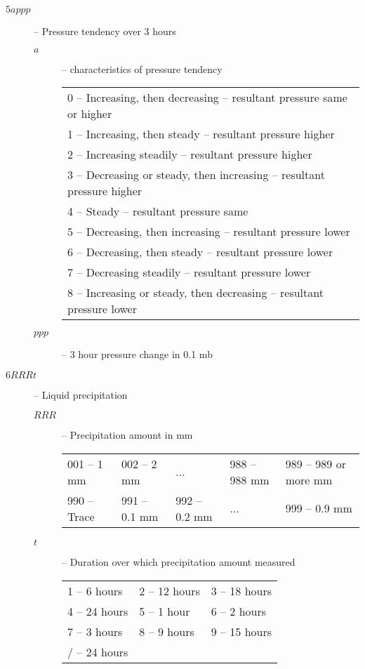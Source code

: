 \documentclass{article}
\begin{document}
\begin{description}
\item[$5appp$] -- Pressure tendency over 3 hours
  \begin{description}
  \item[$a$] -- characteristics of pressure tendency
    \begin{tabular}{l}
      0 -- Increasing, then decreasing -- resultant pressure same or higher\\
      1 -- Increasing, then steady -- resultant pressure higher\\
      2 -- Increasing steadily -- resultant pressure higher\\
      3 -- Decreasing or steady, then increasing -- resultant pressure higher\\
      4 -- Steady -- resultant pressure same\\
      5 -- Decreasing, then increasing -- resultant pressure lower\\
      6 -- Decreasing, then steady -- resultant pressure lower\\
      7 -- Decreasing steadily -- resultant pressure lower\\
      8 -- Increasing or steady, then decreasing -- resultant pressure lower\\
    \end{tabular}
  \item[$ppp$] -- 3 hour pressure change in 0.1 mb
  \end{description}
\end{description}
\begin{description}
\item[$6RRRt$] -- Liquid precipitation
  \begin{description}
  \item[$RRR$] -- Precipitation amount in mm

    \begin{tabular}{lllll}
      001 -- 1 mm&002 -- 2 mm&...&988 -- 988 mm&989 -- 989 or more mm\\
      990 -- Trace&991 -- 0.1 mm&992 -- 0.2 mm&...&999 -- 0.9 mm
    \end{tabular}
  \item[$t$] -- Duration over which precipitation amount measured

    \begin{tabular}{lll}
      1 -- 6 hours&2 -- 12 hours&3 -- 18 hours\\
      4 -- 24 hours&5 -- 1 hour& 6 -- 2 hours\\
      7 -- 3 hours&8 -- 9 hours&9 -- 15 hours\\
      / -- 24 hours& &
    \end{tabular}
  \end{description}
\end{description}
\end{document}

